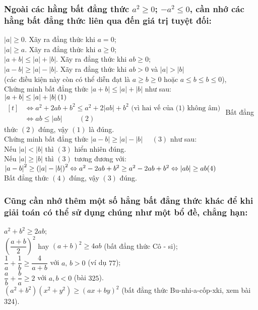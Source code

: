 \subsubsection{Ngoài các hằng bất đẳng thức $a^2\geq 0$; $-a^2\leq 0$, cần nhớ các hằng bất đẳng thức liên qua đến giá trị tuyệt đối:}
$\left|a\right|\geq 0$. Xãy ra đẳng thức khi $a=0$;\\
$\left|a\right|\geq a$. Xãy ra đẳng thức khi $a\geq 0$;\\
$\left|a+b\right|\leq \left|a\right|+\left|b\right|$. Xãy ra đẳng thức khi $ab\geq 0$;\\
$\left|a-b\right|\geq \left|a\right|-\left|b\right|$. Xãy ra đẳng thức khi $ab>0$ và $\left|a\right|>\left|b\right|$\\
(các điều kiện này còn có thể diễn đạt là $a\geq b\geq 0$ hoặc $a\leq b\leq b\leq 0$),\\
Chứng minh bất đẳng thức $\left|a+b\right|\leq \left|a\right|+\left|b\right|$ như sau:\\
\hspace{3cm}$\left|a+b\right|\leq \left|a\right|+\left|b\right|\hfill (1)$\\
$\begin{aligned}[t]
&\Leftrightarrow a^2+2ab+b^2\leq a^2+2\left|ab\right|+b^2 \text{ (vì hai vế của (1) không âm)}\\
&\Leftrightarrow ab\leq \left|ab\right| \hspace{1cm} (2)
\end{aligned}$
Bất đẳng thức $(2)$ đúng, vậy $(1)$ là đúng.\\
Chứng minh bất đẳng thức $\left|a-b\right|\geq \left|a\right|-\left|b\right|$ $\quad (3)$ như sau:\\
Nếu $\left|a\right|<\left|b\right|$ thì $(3)$ hiển nhiên đúng.\\
Nếu $\left|a\right|\geq \left|b\right|$ thì $(3)$ tương đương với:\\
$\left|a-b\right|^2\geq \left(\left|a\right|-\left|b\right|\right)^2\Leftrightarrow a^2-2ab+b^2\geq a^2-2ab+b^2\Leftrightarrow \left|ab\right|\geq ab\hfill (4)$\\
Bất đẳng thức $(4)$ đúng, vậy $(3)$ đúng.
\subsubsection{Cũng cần nhớ thêm một số hẳng bất đẳng thức khác để khi giải toán có thể sử dụng chúng như một bổ đề, chẳng hạn:}
$a^2+b^2\geq 2ab$;\\
$\left(\dfrac{a+b}{2}\right)^2$ hay $\left(a+b\right)^2\geq 4ab$ (bất đẳng thức Cô - si);\\
$\dfrac{1}{a}+\dfrac{1}{b}\geq \dfrac{4}{a+b}$ với $a,\,b>0$ (ví dụ $77$);\\
$\dfrac{a}{b}+\dfrac{b}{a}\geq 2$ với $a,b<0$ (bài $325$).\\
$\left(a^2+b^2\right)\left(x^2+y^2\right)\geq \left(ax+by\right)^2$ (bất đẳng thức Bu-nhi-a-cốp-xki, xem bài 324).
